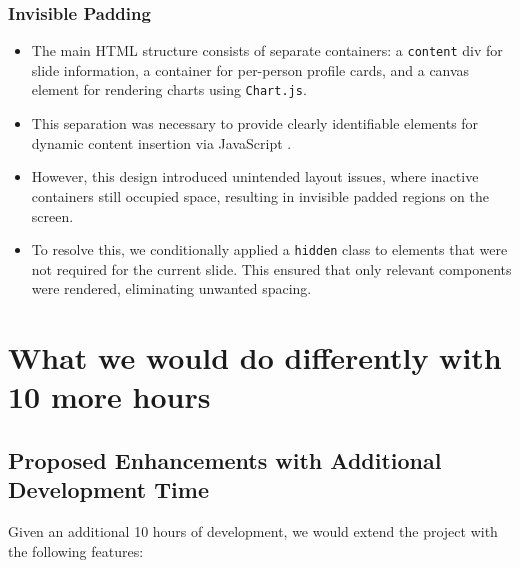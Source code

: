 \documentclass[11pt,a4paper]{article}
\begin{document}
\subsubsection{Invisible Padding}
\begin{itemize}
\item The main HTML structure consists of separate containers: a \texttt{content} div for slide information, a container for per-person profile cards, and a canvas element for rendering charts using \texttt{Chart.js}.
    
\item This separation was necessary to provide clearly identifiable elements for dynamic content insertion via JavaScript \cite{javascript,dom}.
    
\item However, this design introduced unintended layout issues, where inactive containers still occupied space, resulting in invisible padded regions on the screen.
    
\item To resolve this, we conditionally applied a \texttt{hidden} class to elements that were not required for the current slide. This ensured that only relevant components were rendered, eliminating unwanted spacing.
\end{itemize}

\section{What we would do differently with 10 more hours}
\subsection{Proposed Enhancements with Additional Development Time}

Given an additional 10 hours of development, we would extend the project with the following features:
\end{document}
